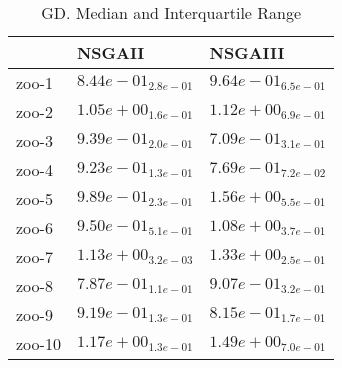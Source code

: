 \documentclass{article}
\begin{document}
\begin{table}
\caption{GD. Median and Interquartile Range}
\label{table: GD}
\centering
\begin{scriptsize}
\begin{tabular}{lll}
\hline & NSGAII &  NSGAIII\\
\hline 
zoo-1 & \cellcolor{gray95}$  8.44e-01_{ 2.8e-01}$ & \cellcolor{gray25}$  9.64e-01_{ 6.5e-01}$ \\
zoo-2 & \cellcolor{gray95}$  1.05e+00_{ 1.6e-01}$ & \cellcolor{gray25}$  1.12e+00_{ 6.9e-01}$ \\
zoo-3 & \cellcolor{gray25}$  9.39e-01_{ 2.0e-01}$ & \cellcolor{gray95}$  7.09e-01_{ 3.1e-01}$ \\
zoo-4 & \cellcolor{gray25}$  9.23e-01_{ 1.3e-01}$ & \cellcolor{gray95}$  7.69e-01_{ 7.2e-02}$ \\
zoo-5 & \cellcolor{gray95}$  9.89e-01_{ 2.3e-01}$ & \cellcolor{gray25}$  1.56e+00_{ 5.5e-01}$ \\
zoo-6 & \cellcolor{gray95}$  9.50e-01_{ 5.1e-01}$ & \cellcolor{gray25}$  1.08e+00_{ 3.7e-01}$ \\
zoo-7 & \cellcolor{gray95}$  1.13e+00_{ 3.2e-03}$ & \cellcolor{gray25}$  1.33e+00_{ 2.5e-01}$ \\
zoo-8 & \cellcolor{gray95}$  7.87e-01_{ 1.1e-01}$ & \cellcolor{gray25}$  9.07e-01_{ 3.2e-01}$ \\
zoo-9 & \cellcolor{gray25}$  9.19e-01_{ 1.3e-01}$ & \cellcolor{gray95}$  8.15e-01_{ 1.7e-01}$ \\
zoo-10 & \cellcolor{gray95}$  1.17e+00_{ 1.3e-01}$ & \cellcolor{gray25}$  1.49e+00_{ 7.0e-01}$ \\
\hline
\end{tabular}
\end{scriptsize}
\end{table}
\end{document}
